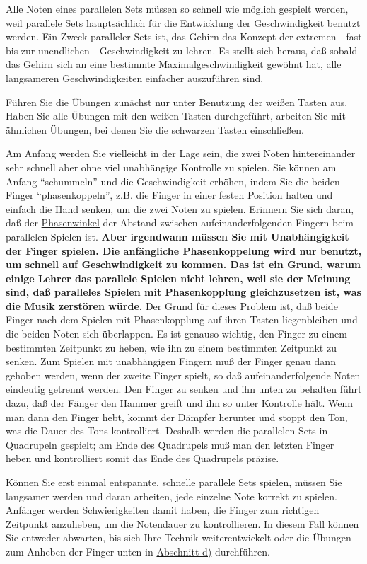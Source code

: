 Alle Noten eines parallelen Sets müssen so schnell wie möglich gespielt werden, weil parallele Sets hauptsächlich für die Entwicklung der Geschwindigkeit benutzt werden.
Ein Zweck paralleler Sets ist, das Gehirn das Konzept der extremen - fast bis zur unendlichen - Geschwindigkeit zu lehren.
Es stellt sich heraus, daß sobald das Gehirn sich an eine bestimmte Maximalgeschwindigkeit gewöhnt hat, alle langsameren Geschwindigkeiten einfacher auszuführen sind.

Führen Sie die Übungen zunächst nur unter Benutzung der weißen Tasten aus.
Haben Sie alle Übungen mit den weißen Tasten durchgeführt, arbeiten Sie mit ähnlichen Übungen, bei denen Sie die schwarzen Tasten einschließen.

Am Anfang werden Sie vielleicht in der Lage sein, die zwei Noten hintereinander sehr schnell aber ohne viel unabhängige Kontrolle zu spielen.
Sie können am Anfang \enquote{schummeln} und die Geschwindigkeit erhöhen, indem Sie die beiden Finger \enquote{phasenkoppeln}, z.B. die Finger in einer festen Position halten und einfach die Hand senken, um die zwei Noten zu spielen.
Erinnern Sie sich daran, daß der \hyperlink{c1iv2a}{Phasenwinkel} der Abstand zwischen aufeinanderfolgenden Fingern beim parallelen Spielen ist.
\textbf{Aber irgendwann müssen Sie mit Unabhängigkeit der Finger spielen.
Die anfängliche Phasenkoppelung wird nur benutzt, um schnell auf Geschwindigkeit zu kommen.
Das ist ein Grund, warum einige Lehrer das parallele Spielen nicht lehren, weil sie der Meinung sind, daß paralleles Spielen mit Phasenkopplung gleichzusetzen ist, was die Musik zerstören würde.}
Der Grund für dieses Problem ist, daß beide Finger nach dem Spielen mit Phasenkopplung auf ihren Tasten liegenbleiben und die beiden Noten sich überlappen.
Es ist genauso wichtig, den Finger zu einem bestimmten Zeitpunkt zu heben, wie ihn zu einem bestimmten Zeitpunkt zu senken.
Zum Spielen mit unabhängigen Fingern muß der Finger genau dann gehoben werden, wenn der zweite Finger spielt, so daß aufeinanderfolgende Noten eindeutig getrennt werden.
Den Finger zu senken und ihn unten zu behalten führt dazu, daß der Fänger den Hammer greift und ihn so unter Kontrolle hält.
Wenn man dann den Finger hebt, kommt der Dämpfer herunter und stoppt den Ton, was die Dauer des Tons kontrolliert.
Deshalb werden die parallelen Sets in Quadrupeln gespielt; am Ende des Quadrupels muß man den letzten Finger heben und kontrolliert somit das Ende des Quadrupels präzise.

Können Sie erst einmal entspannte, schnelle parallele Sets spielen, müssen Sie langsamer werden und daran arbeiten, jede einzelne Note korrekt zu spielen.
Anfänger werden Schwierigkeiten damit haben, die Finger zum richtigen Zeitpunkt anzuheben, um die Notendauer zu kontrollieren.
In diesem Fall können Sie entweder abwarten, bis sich Ihre Technik weiterentwickelt oder die Übungen zum Anheben der Finger unten in \hyperlink{c1iii7d}{Abschnitt d)} durchführen.


